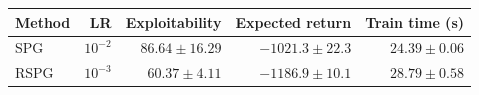\begin{tabular}{lrrrr}
\toprule
Method & LR & Exploitability & Expected return & Train time (s) \\
\midrule
SPG & $10^{-2}$ & $86.64 \pm 16.29$ & $-1021.3 \pm 22.3$ & $24.39 \pm 0.06$ \\
RSPG & $10^{-3}$ & $60.37 \pm 4.11$ & $-1186.9 \pm 10.1$ & $28.79 \pm 0.58$ \\
\bottomrule
\end{tabular}
